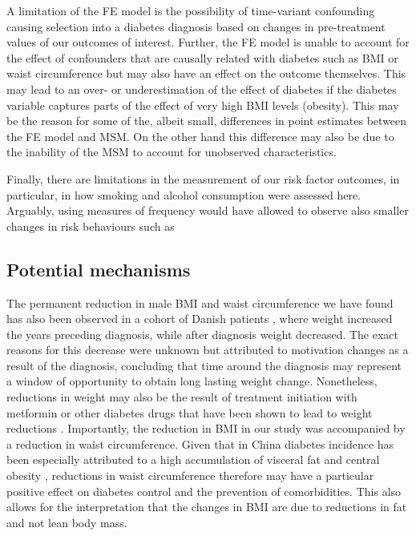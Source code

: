 A limitation of the \ac{FE} model is the possibility of time-variant confounding causing selection into a diabetes diagnosis based on changes in pre-treatment values of our outcomes of interest. Further, the \ac{FE} model is unable to account for the effect of confounders that are causally related with diabetes such as \ac{BMI} or waist circumference but may also have an effect on the outcome themselves. This may lead to an over- or underestimation of the effect of diabetes if the diabetes variable captures parts of the effect of very high \ac{BMI} levels (obesity). This may be the reason for some of the, albeit small, differences in point estimates between the \ac{FE} model and \ac{MSM}. On the other hand this difference may also be due to the inability of the \ac{MSM} to account for unobserved characteristics.

Finally, there are limitations in the measurement of our risk factor outcomes, in particular, in how smoking and alcohol consumption were assessed here. Arguably, using measures of frequency would have allowed to observe also smaller changes in risk behaviours such as 


\subsection{Potential mechanisms}

The permanent reduction in male \ac{BMI} and waist circumference we have found has also been observed in a cohort of Danish patients \autocite{DeFineOlivarius2015}, where weight increased the years preceding diagnosis, while after diagnosis weight decreased. The exact reasons for this decrease were unknown but attributed to motivation changes as a result of the diagnosis, concluding that time around the diagnosis may represent a window of opportunity to obtain long lasting weight change. Nonetheless, reductions in weight may also be the result of treatment initiation with metformin or other diabetes drugs that have been shown to lead to weight reductions \autocite{Yang2014}. Importantly, the reduction in \ac{BMI} in our study was accompanied by a reduction in waist circumference.  Given that in China diabetes incidence has been especially attributed to a high accumulation of visceral fat and central obesity \autocite{Ma2014}, reductions in waist circumference therefore may have a particular positive effect on diabetes control and the prevention of comorbidities. This also allows for the interpretation  that the changes in \ac{BMI} are due to reductions in fat and not lean body mass\autocite{Klein2007}.

